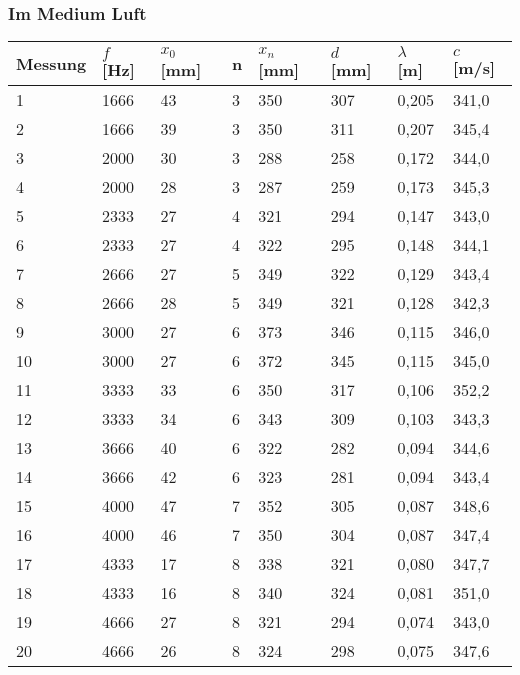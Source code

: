 \documentclass{scrartcl}
\begin{document}
\subsubsection{Im Medium Luft}
\begin{table}[h]
\begin{tabular}{l|l|l|l|l|l|l|l}
Messung & $f$ {[}Hz{]} & $x_{0}$ [mm] & n & $x_{n}$ [mm] & $d$ [mm]   & $\lambda$ [m]      & $c$ [m/s]      \\
\hline
1       & 1666       & 43                & 3 & 350               & 307 & 0,205 & 341,0 \\
2       & 1666       & 39                & 3 & 350               & 311 & 0,207 & 345,4 \\
3       & 2000       & 30                & 3 & 288               & 258 & 0,172 & 344,0 \\
4       & 2000       & 28                & 3 & 287               & 259 & 0,173 & 345,3 \\
5       & 2333       & 27                & 4 & 321               & 294 & 0,147 & 343,0 \\
6       & 2333       & 27                & 4 & 322               & 295 & 0,148 & 344,1 \\
7       & 2666       & 27                & 5 & 349               & 322 & 0,129 & 343,4 \\
8       & 2666       & 28                & 5 & 349               & 321 & 0,128 & 342,3 \\
9       & 3000       & 27                & 6 & 373               & 346 & 0,115 & 346,0 \\
10      & 3000       & 27                & 6 & 372               & 345 & 0,115 & 345,0 \\
11      & 3333       & 33                & 6 & 350               & 317 & 0,106 & 352,2 \\
12      & 3333       & 34                & 6 & 343               & 309 & 0,103 & 343,3 \\
13      & 3666       & 40                & 6 & 322               & 282 & 0,094 & 344,6 \\
14      & 3666       & 42                & 6 & 323               & 281 & 0,094 & 343,4 \\
15      & 4000       & 47                & 7 & 352               & 305 & 0,087 & 348,6 \\
16      & 4000       & 46                & 7 & 350               & 304 & 0,087 & 347,4 \\
17      & 4333       & 17                & 8 & 338               & 321 & 0,080 & 347,7 \\
18      & 4333       & 16                & 8 & 340               & 324 & 0,081 & 351,0 \\
19      & 4666       & 27                & 8 & 321               & 294 & 0,074 & 343,0 \\
20      & 4666       & 26                & 8 & 324               & 298 & 0,075 & 347,6
\end{tabular}
\end{table}
\end{document}
